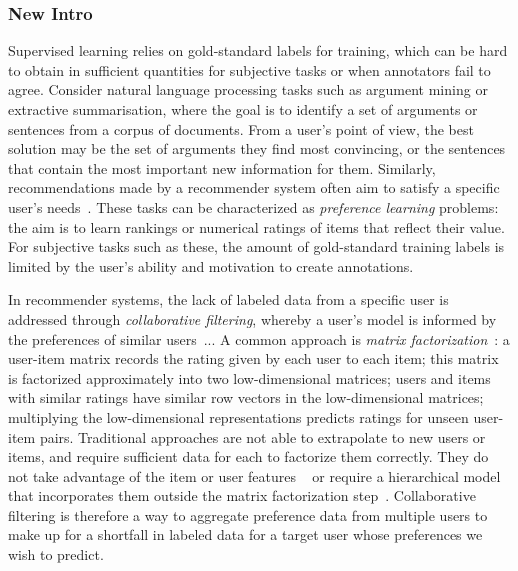 \subsubsection*{New Intro}

Supervised learning relies on gold-standard labels for training, 
which can be hard to obtain in sufficient quantities 
for subjective tasks or 
when annotators fail to agree. 
Consider natural language processing tasks such as
argument mining or extractive summarisation, 
where the goal is to identify a set of arguments or sentences from a corpus of documents.
From a user's point of view, the best solution may be the set of arguments they find most convincing,
or the sentences that contain the most important new information for them. 
Similarly, recommendations made by a recommender system 
often aim to satisfy a specific user's needs~\cite{??}.
These tasks can be characterized as \emph{preference learning} problems:
the aim is to learn rankings or numerical ratings of items that reflect their value.
For subjective tasks such as these, the amount of gold-standard training 
labels is limited by the user's ability and motivation to create annotations.

In recommender systems, the lack of labeled data from a specific user is addressed through \emph{collaborative filtering}, whereby a user's model is informed by the preferences of similar users~\cite{?}... 
A common approach is \emph{matrix factorization}~\cite{?}:
a user-item matrix records the rating given by each user to each item; 
this matrix is factorized approximately into two low-dimensional matrices;
users and items with similar ratings have similar row vectors in the low-dimensional
matrices; 
multiplying the low-dimensional representations predicts ratings for unseen
user-item pairs. 
Traditional approaches are not able to extrapolate to new users or items,
and require sufficient data for each to factorize them correctly. They do not take advantage of the item or user features
~\cite{?} or require a hierarchical model that incorporates them outside the matrix factorization step~\cite{?}. 
Collaborative filtering is therefore a way to aggregate preference data from multiple users to make up for a shortfall in labeled data for a target user whose preferences we 
wish to predict.

